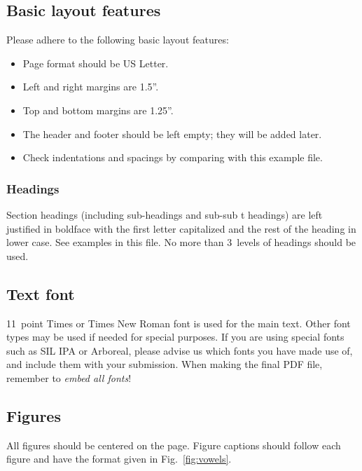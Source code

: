 \documentclass[11pt]{article}
\begin{document}
\subsection{Basic layout features}
Please adhere to the following basic layout features:
\begin{itemize}
\item Page format should be US Letter.
\item Left and right margins are 1.5''.
\item Top and bottom margins are 1.25''.
\item The header and footer should be left empty; they will be added later.
\item Check indentations and spacings by comparing with this example file.
\end{itemize}

\subsubsection{Headings}

Section headings (including sub-headings and sub-sub t headings) are left
justified in boldface with the first letter capitalized and the rest of the
heading in lower case. See examples in this file. No more than 3~levels of
headings should be used.

\subsection{Text font}

11~point Times or Times New Roman font is used for the main text. Other font
types may be used if needed for special purposes. If you are using special fonts
such as SIL IPA or Arboreal, please advise us which fonts you have made use of,
and include them with your submission. When making the final PDF file, remember
to \textit{embed all fonts}!

\subsection{Figures}

All figures should be centered on the page. Figure captions should follow each 
figure and have the format given in Fig.~\ref{fig:vowels}.\\
\end{document}
